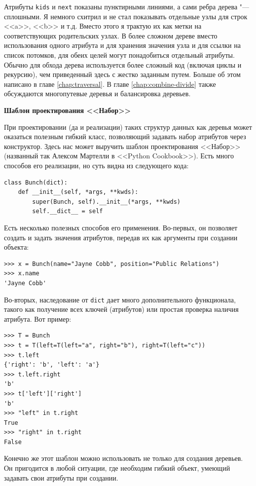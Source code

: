 Атрибуты \texttt{kids} и \texttt{next} показаны пунктирными линиями, а сами ребра дерева "--- сплошными. Я немного схитрил и не стал показывать отдельные узлы для строк <<a>>, <<b>> и т.д. Вместо этого я трактую их как метки на соответствующих родительских узлах. В более сложном дереве вместо использования одного атрибута и для хранения значения узла и для ссылки на список потомков, для обеих целей могут понадобиться отдельный атрибуты. Обычно для обхода дерева используется более сложный код (включая циклы и рекурсию), чем приведенный здесь с жестко заданным путем. Больше об этом написано в главе \ref{chap:traversal}. В главе \ref{chap:combine-divide} также обсуждаются многопутевые деревья и балансировка деревьев.

{\bf Шаблон проектирования <<Набор>>}

При проектировании (да и реализации) таких структур данных как деревья может оказаться полезным гибкий класс, позволяющий задавать набор атрибутов через конструктор. Здесь нас может выручить шаблон проектирования <<Набор>> (названный так Алексом Мартелли в <<Python Cookbook>>). Есть много способов его реализации, но суть видна из следующего кода:
\begin{lstlisting}
class Bunch(dict):
	def __init__(self, *args, **kwds):
		super(Bunch, self).__init__(*args, **kwds)
		self.__dict__ = self
\end{lstlisting}

Есть несколько полезных способов его применения. Во-первых, он позволяет создать и задать значения атрибутов, передав их как аргументы при создании объекта:
\begin{lstlisting}
>>> x = Bunch(name="Jayne Cobb", position="Public Relations")
>>> x.name
'Jayne Cobb'
\end{lstlisting}

Во-вторых, наследование от \texttt{dict} дает много дополнительного функционала, такого как получение всех ключей (атрибутов) или простая проверка наличия атрибута. Вот пример:
\begin{lstlisting}
>>> T = Bunch
>>> t = T(left=T(left="a", right="b"), right=T(left="c"))
>>> t.left
{'right': 'b', 'left': 'a'}
>>> t.left.right
'b'
>>> t['left']['right']
'b'
>>> "left" in t.right
True
>>> "right" in t.right
False
\end{lstlisting}

Конечно же этот шаблон можно использовать не только для создания деревьев. Он пригодится в любой ситуации, где необходим гибкий объект, умеющий задавать свои атрибуты при создании.

